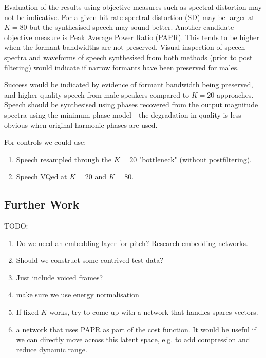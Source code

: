 \documentclass{article}
\begin{document}
Evaluation of the results using objective measures such as spectral distortion may not be indicative.  For a given bit rate spectral distortion (SD) may be larger at $K=80$ but the synthesised speech may sound better. Another candidate objective measure is Peak Average Power Ratio (PAPR). This tends to be higher when the formant bandwidths are not preserved. Visual inspection of speech spectra and waveforms of speech synthesised from both methods (prior to post filtering) would indicate if narrow formants have been preserved for males.

Success would be indicated by evidence of formant bandwidth being preserved, and higher quality speech from male speakers compared to $K=20$ approaches. Speech should be synthesised using phases recovered from the output magnitude spectra using the minimum phase model - the degradation in quality is less obvious when original harmonic phases are used. 

For controls we could use:
\begin{enumerate}
\item Speech resampled through the $K=20$ "bottleneck" (without postfiltering).
\item Speech VQed at $K=20$ and $K=80$. 
\end{enumerate}

\subsection{Further Work}

TODO:
\begin{enumerate}
\item Do we need an embedding layer for pitch?  Research embedding networks.
\item Should we construct some contrived test data?
\item Just include voiced frames?
\item make sure we use energy normalisation
\item If fixed $K$ works, try to come up with a network that handles spares vectors.
\item a network that uses PAPR as part of the cost function.  It would be useful if we can directly move across this latent space, e.g. to add compression and reduce dynamic range.
\end{enumerate}



\end{document}
